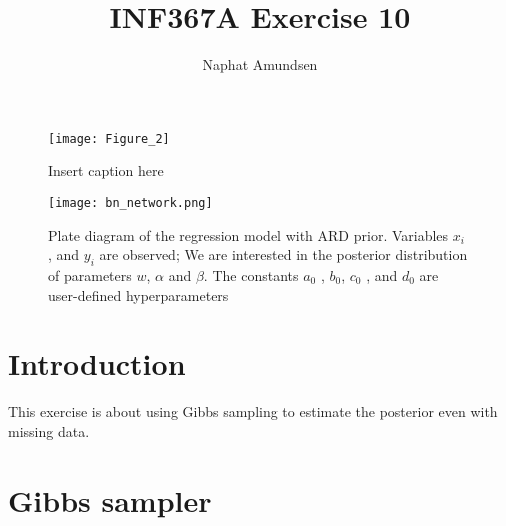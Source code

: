 \documentclass[12pt]{article}
\begin{document}
\title{\textbf{INF367A Exercise 10}}
\author{Naphat Amundsen}
\maketitle
\sectionfont{\fontsize{14}{15}\selectfont}
\subsectionfont{\fontsize{12}{15}\selectfont}
\subsubsectionfont{\fontsize{12}{15}\selectfont}
\graphicspath{ {./images/} }

\ifx
\begin{figure}[H]
	\centering
	\texttt{[image: Figure\_2]}
	\caption{Insert caption here}
\end{figure}
\fi
\ifx
\begin{figure}[H]
	\centering
	\texttt{[image: bn\_network.png]}
	\caption{Plate diagram of the regression model with ARD prior. Variables $x_i$ , and $y_i$ are observed; We are interested in the posterior distribution of parameters $w$, $\alpha$ and $\beta$. The constants $a_0$ , $b_0$, $c_0$ , and $d_0$ are user-defined hyperparameters}
\end{figure}
\fi

\newcommand{\opGamma}{\operatorname{Gamma}}

\section{Introduction}
    This exercise is about using Gibbs sampling to estimate the posterior even with missing data. 

\section{Gibbs sampler}
\end{document}
